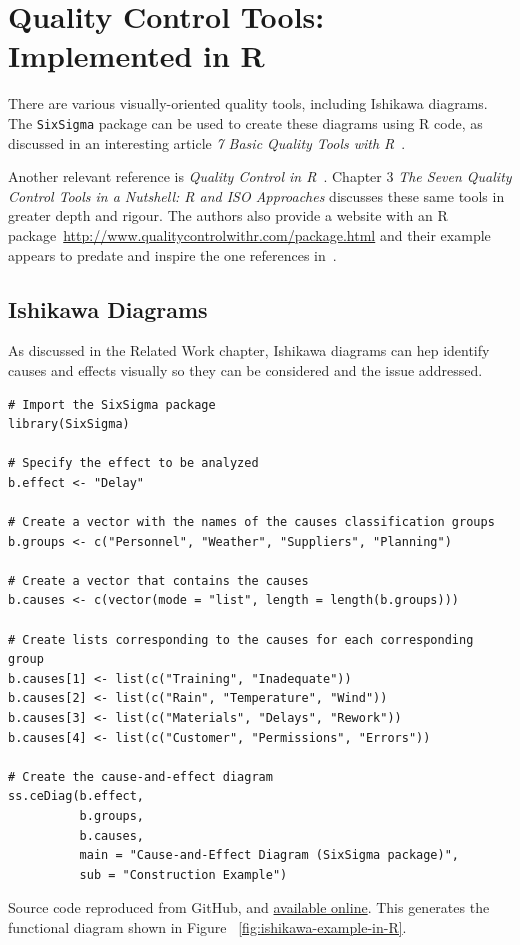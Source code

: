 \section{Quality Control Tools: Implemented in R}
There are various visually-oriented quality tools, including Ishikawa diagrams. The \texttt{SixSigma} package can be used to create these diagrams using R code, as discussed in an interesting article \emph{7 Basic Quality Tools with R}~\cite{7_basic_quality_tools_with_R}.

Another relevant reference is \emph{Quality Control in R}~\cite{quality_control_in_R_book}. Chapter 3 \emph{The Seven Quality Control Tools in a Nutshell: R and ISO Approaches} discusses these same tools in greater depth and rigour. The authors also provide a website with an R package~\url{http://www.qualitycontrolwithr.com/package.html} and their example appears to predate and inspire the one references in~\cite{7_basic_quality_tools_with_R}.

\subsection{Ishikawa Diagrams}
As discussed in the Related Work chapter, Ishikawa diagrams can hep identify causes and effects visually so they can be considered and the issue addressed.

\begin{lstlisting}
# Import the SixSigma package
library(SixSigma)

# Specify the effect to be analyzed
b.effect <- "Delay"

# Create a vector with the names of the causes classification groups
b.groups <- c("Personnel", "Weather", "Suppliers", "Planning")

# Create a vector that contains the causes
b.causes <- c(vector(mode = "list", length = length(b.groups)))

# Create lists corresponding to the causes for each corresponding group
b.causes[1] <- list(c("Training", "Inadequate"))
b.causes[2] <- list(c("Rain", "Temperature", "Wind"))
b.causes[3] <- list(c("Materials", "Delays", "Rework"))
b.causes[4] <- list(c("Customer", "Permissions", "Errors"))

# Create the cause-and-effect diagram
ss.ceDiag(b.effect,
          b.groups,
          b.causes,
          main = "Cause-and-Effect Diagram (SixSigma package)",
          sub = "Construction Example")
\end{lstlisting}
Source code reproduced from GitHub, and \href{https://gist.github.com/rsalaza4/eff4a0a7e8e4894e4b82152fcf66e847/raw/cfbfe93c784989ee8fd6b686dd26fb88f4cec26d/Cause-and-effect\%20diagram.R}{available online}. This generates the functional diagram shown in Figure ~\ref{fig:ishikawa-example-in-R}.

